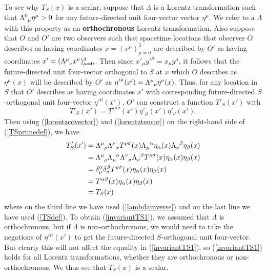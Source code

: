 To see why $T_S(x)$ is a scalar, suppose that $\Lambda$ is a Lorentz transformation such that $\Lambda\indices{^0_\mu}\eta^\mu>0$ for any future-directed  unit four-vector vector $\eta^\mu$. We refer to a $\Lambda$ with this property as an \textbf{orthochronous} Lorentz transformation. Also suppose that $O$ and $O'$ are two observers such that spacetime locations that observer $O$ describes as having coordinates $x=(x^\mu)_{\mu=0}^3$ are described by $O'$ as having coordinates $x'=(\Lambda\indices{^\mu_\nu}x^\nu)_{\mu=0}^3$. Then since ${x'}_\mu{y'}^\mu= x_\mu y^\mu$, it follows that the future-directed unit four-vector orthogonal to $S$ at $x$ which $O$ describes as $\eta^\mu(x)$ will be described by $O'$ as  ${\eta'}^\mu(x')=\Lambda\indices{^\mu_\nu}\eta^\nu(x)$. Thus, for any location in $S$ that $O'$ describes as having coordinates $x'$ with corresponding  future-directed $S$-orthogonal unit four-vector ${\eta'}^\mu(x')$, $O'$ can construct a function $T'_S(x')$  with 
\begin{equation}\label{TSprimedef}
T'_S(x')=T'^{\mu\nu}(x')\eta'_{\mu}(x')\eta'_{\nu}(x').
\end{equation}
Then using  (\ref{lorentzcovector}) and (\ref{lorentztensor}) on the right-hand side of (\ref{TSprimedef}),  we have
\begin{equation}\label{invariantTS1}
\begin{split}
T'_S(x')&=\Lambda\indices{^\mu_\rho}\Lambda\indices{^\nu_\sigma}T^{\rho\sigma}(x)\Lambda\indices{_\mu^\alpha}\eta_{\alpha}(x)\Lambda\indices{_\nu^\beta}\eta_{\beta}(x)\\
&=\Lambda\indices{^\mu_\rho}\Lambda\indices{_\mu^\alpha} \Lambda\indices{^\nu_\sigma}\Lambda\indices{_\nu^\beta}T^{\rho\sigma}(x)\eta_{\alpha}(x)\eta_{\beta}(x)\\
&=\delta^\alpha_\rho\delta^\beta_\sigma T^{\rho\sigma}(x)\eta_{\alpha}(x)\eta_{\beta}(x)\\
&=T^{\alpha\beta}(x)\eta_{\alpha}(x)\eta_{\beta}(x)\\
&=T_S(x)
\end{split}
\end{equation}
where on the third line we have used (\ref{lambdainverse}) and on the last line we have used (\ref{TSdef}). To obtain (\ref{invariantTS1}), we assumed that $\Lambda$ is orthochronous, but if $\Lambda$ is non-orthochronous, we would need to take the negations of ${\eta'}^\mu(x')$ to get the future-directed $S$-orthogonal unit four-vector. But clearly this will not affect the equality in (\ref{invariantTS1}), so (\ref{invariantTS1}) holds for all Lorentz transformations, whether they are orthochronous or non-orthochronous.  We thus see that   $T_S(x)$ is a scalar.

